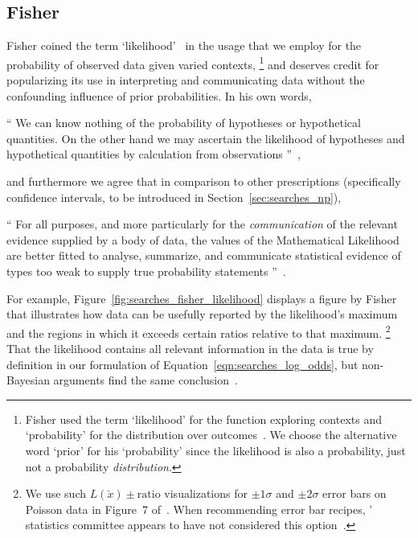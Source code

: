 \subsection{Fisher}
\label{sec:searches_fisher}
Fisher coined the term `likelihood'~\cite{
fisher1912fitting,
fisher1915frequency,
fisher1921probable,
fisher1922estimators
} in the usage that
we employ for the probability of observed data given varied
contexts,%
\footnote{%
Fisher used the term `likelihood' for the function exploring
contexts and `probability' for the distribution over
outcomes~\cite{fisher1925smrw}.
We choose the alternative word `prior' for his `probability' since the
likelihood is also a probability, just not a probability \emph{distribution}.
}
and deserves credit for popularizing its use in interpreting and communicating
data without the confounding influence of prior probabilities.
In his own words,%
\begin{displayquote}
\small
``%
We can know nothing of the probability of hypotheses or hypothetical
quantities.
On the other hand we may ascertain the likelihood of hypotheses
and hypothetical quantities by calculation from observations%
''~\cite{fisher1921probable},
\end{displayquote}
and furthermore we agree that in comparison to other prescriptions
(specifically confidence intervals, to be introduced in
Section~\ref{sec:searches_np}),
\begin{displayquote}
\small
``%
For all purposes, and more particularly for the \textit{communication} of the
relevant evidence supplied by a body of data, the values of the Mathematical
Likelihood are better fitted to analyse, summarize, and communicate
statistical evidence of types too weak to supply true probability statements%
''~\cite{fisher1956statistical}.
\end{displayquote}
For example, Figure~\ref{fig:searches_fisher_likelihood} displays a figure by
Fisher~\cite{fisher1956statistical} that illustrates how data can be usefully
reported by the likelihood's maximum and the regions in which it exceeds
certain ratios relative to that maximum.%
\footnote{%
We use such $L(\check{x})\pm\mathrm{ratio}$ visualizations for
$\pm1\sigma$ and $\pm2\sigma$ error bars on Poisson data in
Figure~7 of~\cite{lester2022hunting}.
When recommending error bar recipes, \atlas' statistics committee appears
to have not considered this option~\cite{cowan2011errorbars}.
}
That the likelihood contains all relevant information in the data is true by
definition in our formulation of Equation~\ref{eqn:searches_log_odds},
but non-Bayesian arguments find the same conclusion~\cite{
birnbaum1962foundations,
savage1962foundations
}.

